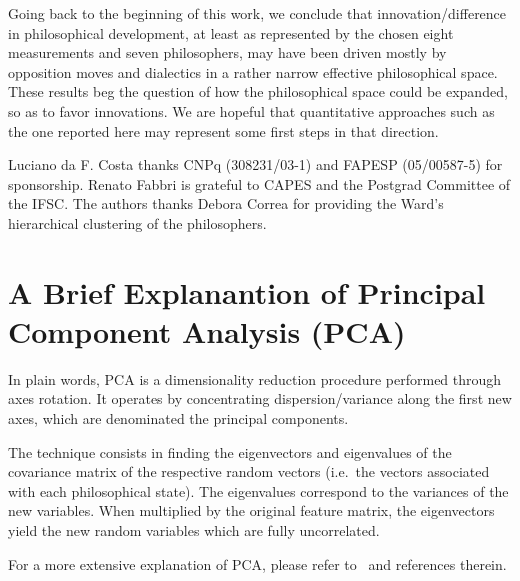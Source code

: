 \documentclass[%
 aip,
 jmp,%
 amsmath,amssymb,
 reprint,%
]{revtex4-1}
\begin{document}
Going back to the beginning of this work, we conclude that
innovation/difference in philosophical development, at least as
represented by the chosen eight measurements and seven philosophers,
may have been driven mostly by opposition moves and dialectics in a
rather narrow effective philosophical space.  These results beg the
question of how the philosophical space could be expanded, so as to
favor innovations.  We are hopeful that quantitative approaches such
as the one reported here may represent some first steps in that
direction.

\begin{acknowledgments}
Luciano da F. Costa thanks CNPq (308231/03-1) and FAPESP (05/00587-5)
for sponsorship. Renato Fabbri is grateful to CAPES and 
the Postgrad Committee of the IFSC.  The authors thanks Debora
Correa for providing the Ward's hierarchical clustering of the
philosophers.
\end{acknowledgments}


\appendix

\section{A Brief Explanantion of Principal Component Analysis (PCA)}

In plain words, PCA is a dimensionality reduction procedure performed
through axes rotation.  It operates by concentrating
dispersion/variance along the first new axes, which are denominated
the principal components.

The technique consists in finding the eigenvectors and eigenvalues of
the covariance matrix of the respective random vectors (i.e.\ the
vectors associated with each philosophical state). The eigenvalues
correspond to the variances of the new variables.  When multiplied by
the original feature matrix, the eigenvectors yield the new random
variables which are fully uncorrelated.

For a more extensive explanation of PCA, please refer to~\cite{Costa}
and references therein.

\nocite{*}
\end{document}
